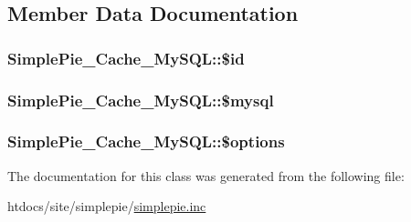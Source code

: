 \subsection{Member Data Documentation}
\hypertarget{class_simple_pie___cache___my_s_q_l_a47fa03a8e70bcc766a06ef7edc30862e}{
\subsubsection[{\$id}]{\setlength{\rightskip}{0pt plus 5cm}Simple\-Pie\-\_\-\-Cache\-\_\-\-My\-S\-Q\-L\-::\$id}}\label{class_simple_pie___cache___my_s_q_l_a47fa03a8e70bcc766a06ef7edc30862e}
\hypertarget{class_simple_pie___cache___my_s_q_l_aa9feba9dea34df69d40a0ab1ad4bc65f}{
\subsubsection[{\$mysql}]{\setlength{\rightskip}{0pt plus 5cm}Simple\-Pie\-\_\-\-Cache\-\_\-\-My\-S\-Q\-L\-::\$mysql}}\label{class_simple_pie___cache___my_s_q_l_aa9feba9dea34df69d40a0ab1ad4bc65f}
\hypertarget{class_simple_pie___cache___my_s_q_l_a2a435924756a07664a16c0ba2293066e}{
\subsubsection[{\$options}]{\setlength{\rightskip}{0pt plus 5cm}Simple\-Pie\-\_\-\-Cache\-\_\-\-My\-S\-Q\-L\-::\$options}}\label{class_simple_pie___cache___my_s_q_l_a2a435924756a07664a16c0ba2293066e}


The documentation for this class was generated from the following file\-:\begin{DoxyCompactItemize}
\item 
htdocs/site/simplepie/\hyperlink{simplepie_8inc}{simplepie.\-inc}\end{DoxyCompactItemize}

